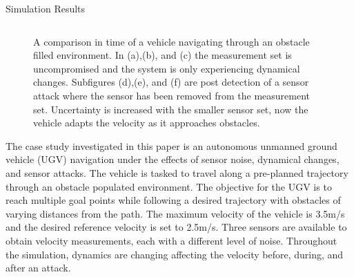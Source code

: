 \begin{section}{Simulation Results}
\begin{figure}[ht!]
\begin{tabular}{ccc}
\end{tabular}
\caption{A comparison in time of a vehicle navigating through an obstacle filled environment. In (a),(b), and (c) the measurement set is uncompromised and the system is only experiencing dynamical changes. Subfigures (d),(e), and (f) are post detection of a sensor attack where the sensor has been removed from the measurement set. Uncertainty is increased with the smaller sensor set, now the vehicle adapts the velocity as it approaches obstacles.}

\end{figure}

The case study investigated in this paper is an autonomous unmanned ground vehicle (UGV) navigation under the effects of sensor noise, dynamical changes, and sensor attacks. The vehicle is tasked to travel along a pre-planned trajectory through an obstacle populated environment. 
The objective for the UGV is to reach multiple goal points while following a desired trajectory with obstacles of varying distances from the path. The maximum velocity of the vehicle is 3.5m/s and the desired reference velocity is set to 2.5m/s. Three sensors are available to obtain velocity measurements, each with a different level of noise. Throughout the simulation, dynamics are changing affecting the velocity before, during, and after an attack. 






\end{section}
